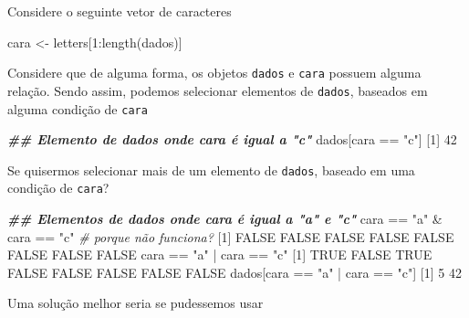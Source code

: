 \documentclass[
  10pt,
  a4paper]{book}
\newenvironment{Shaded}{\begin{snugshade}}{\end{snugshade}}
\newcommand{\CommentTok}[1]{\textcolor[rgb]{0.56,0.35,0.01}{\textit{#1}}}
\newcommand{\ConstantTok}[1]{\textcolor[rgb]{0.00,0.00,0.00}{#1}}
\newcommand{\DecValTok}[1]{\textcolor[rgb]{0.00,0.00,0.81}{#1}}
\newcommand{\DocumentationTok}[1]{\textcolor[rgb]{0.56,0.35,0.01}{\textbf{\textit{#1}}}}
\newcommand{\FunctionTok}[1]{\textcolor[rgb]{0.00,0.00,0.00}{#1}}
\newcommand{\NormalTok}[1]{#1}
\newcommand{\OtherTok}[1]{\textcolor[rgb]{0.56,0.35,0.01}{#1}}
\newcommand{\SpecialCharTok}[1]{\textcolor[rgb]{0.00,0.00,0.00}{#1}}
\newcommand{\StringTok}[1]{\textcolor[rgb]{0.31,0.60,0.02}{#1}}
\begin{document}
Considere o seguinte vetor de caracteres

\begin{Shaded}
\begin{Highlighting}[]
\NormalTok{cara }\OtherTok{\textless{}{-}}\NormalTok{ letters[}\DecValTok{1}\SpecialCharTok{:}\FunctionTok{length}\NormalTok{(dados)]}
\end{Highlighting}
\end{Shaded}

Considere que de alguma forma, os objetos \texttt{dados} e \texttt{cara} possuem
alguma relação. Sendo assim, podemos selecionar elementos de \texttt{dados},
baseados em alguma condição de \texttt{cara}

\begin{Shaded}
\begin{Highlighting}[]
\DocumentationTok{\#\# Elemento de dados onde cara é igual a "c"}
\NormalTok{dados[cara }\SpecialCharTok{==} \StringTok{"c"}\NormalTok{]}
\NormalTok{[}\DecValTok{1}\NormalTok{] }\DecValTok{42}
\end{Highlighting}
\end{Shaded}

Se quisermos selecionar mais de um elemento de \texttt{dados}, baseado em uma
condição de \texttt{cara}?

\begin{Shaded}
\begin{Highlighting}[]
\DocumentationTok{\#\# Elementos de dados onde cara é igual a "a" e "c"}
\NormalTok{cara }\SpecialCharTok{==} \StringTok{"a"} \SpecialCharTok{\&}\NormalTok{ cara }\SpecialCharTok{==} \StringTok{"c"} \CommentTok{\# porque não funciona?}
\NormalTok{[}\DecValTok{1}\NormalTok{] }\ConstantTok{FALSE} \ConstantTok{FALSE} \ConstantTok{FALSE} \ConstantTok{FALSE} \ConstantTok{FALSE} \ConstantTok{FALSE} \ConstantTok{FALSE} \ConstantTok{FALSE}
\NormalTok{cara }\SpecialCharTok{==} \StringTok{"a"} \SpecialCharTok{|}\NormalTok{ cara }\SpecialCharTok{==} \StringTok{"c"}
\NormalTok{[}\DecValTok{1}\NormalTok{]  }\ConstantTok{TRUE} \ConstantTok{FALSE}  \ConstantTok{TRUE} \ConstantTok{FALSE} \ConstantTok{FALSE} \ConstantTok{FALSE} \ConstantTok{FALSE} \ConstantTok{FALSE}
\NormalTok{dados[cara }\SpecialCharTok{==} \StringTok{"a"} \SpecialCharTok{|}\NormalTok{ cara }\SpecialCharTok{==} \StringTok{"c"}\NormalTok{]}
\NormalTok{[}\DecValTok{1}\NormalTok{]  }\DecValTok{5} \DecValTok{42}
\end{Highlighting}
\end{Shaded}

Uma solução melhor seria se pudessemos usar
\end{document}

